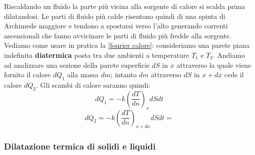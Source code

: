\documentclass[x11names]{article}
\begin{document}
	Riscaldando un fluido la parte più vicina alla sorgente di calore si scalda prima dilatandosi. Le parti di fluido più calde risentono quindi di una spinta di Archimede maggiore e tendono a spostarsi verso l'alto generando correnti ascensionali che fanno avvicinare le parti di fluido più fredde alla sorgente. \\
	
	\noindent
	Vediamo come usare in pratica la \ref{fourier calore}: consideriamo una parete piana indefinita \textbf{diatermica} posta tra due ambienti a temperature \(T_1\) e \(T_2\). Andiamo ad analizzare una sezione della parete superficie \(dS\) in \(x\) attraverso la quale viene fornito il calore \(dQ_1\) alla massa \(dm\); intanto \(dm\) attraverso \(dS\) in \(x + dx\) cede il calore \(dQ_2\). Gli scambi di calore saranno quindi:
	\[ 
	dQ_1 = -k \left(\frac{dT}{dn}\right)_x dS dt
	\]
	\[ 
	dQ_2 = -k \left(\frac{dT}{dn}\right)_{x+dx} dS dt = 
	\]
	
	\subsubsection{Dilatazione termica di solidi e liquidi}
	
\end{document}
